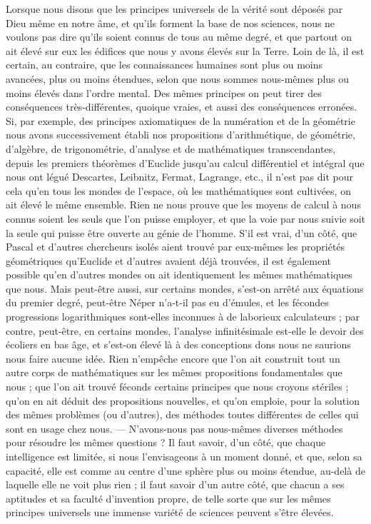 \documentclass[a4paper, 11pt, oneside, landscape]{article}
\begin{document}
Lorsque nous disons que les principes universels de la vérité sont déposés par Dieu même en notre âme, et qu'ils forment la base de nos sciences, nous ne voulons pas dire qu'ils soient connus de tous au même degré, et que partout on ait élevé sur eux les édifices que nous y avons élevés sur la Terre. Loin de là, il est certain, au contraire, que les connaissances humaines sont plus ou moins avancées, plus ou moins étendues, selon que nous sommes nous-mêmes plus ou moins élevés dans l'ordre mental. Des mêmes principes on peut tirer des conséquences très-différentes, quoique vraies, et aussi des conséquences erronées. Si, par exemple, des principes axiomatiques de la numération et de la géométrie nous avons successivement établi nos propositions d'arithmétique, de géométrie, d'algèbre, de trigonométrie, d'analyse et de mathématiques transcendantes, depuis les premiers théorèmes d'Euclide jusqu'au calcul différentiel et intégral que nous ont légué Descartes, Leibnitz, Fermat, Lagrange, etc., il n'est pas dit pour cela qu'en tous les mondes de l'espace, où les mathématiques sont cultivées, on ait élevé le même ensemble. Rien ne nous prouve que les moyens de calcul à nous connus soient les seuls que l'on puisse employer, et que la voie par nous suivie soit la seule qui puisse être ouverte au génie de l'homme. S'il est vrai, d'un côté, que Pascal et d'autres chercheurs isolés aient trouvé par eux-mêmes les propriétés géométriques qu'Euclide et d'autres avaient déjà trouvées, il est également possible qu'en d'autres mondes on ait identiquement les mêmes mathématiques que nous. Mais peut-être aussi, sur certains mondes, s'est-on arrêté aux équations du premier degré, peut-être Néper n'a-t-il pas eu d'émules, et les fécondes progressions logarithmiques sont-elles inconnues à de laborieux calculateurs ; par contre, peut-être, en certains mondes, l'analyse infinitésimale est-elle le devoir des écoliers en bas âge, et s'est-on élevé là à des conceptions dons nous ne saurions nous faire aucune idée. Rien n'empêche encore que l'on ait construit tout un autre corps de mathématiques sur les mêmes propositions fondamentales que nous ; que l'on ait trouvé féconds certains principes que nous croyons stériles ; qu'on en ait déduit des propositions nouvelles, et qu'on emploie, pour la solution des mêmes problèmes (ou d'autres), des méthodes toutes différentes de celles qui sont en usage chez nous. --- N'avons-nous pas nous-mêmes diverses méthodes pour résoudre les mêmes questions ? Il faut savoir, d'un côté, que chaque intelligence est limitée, si nous l'envisageons à un moment donné, et que, selon sa capacité, elle est comme au centre d'une sphère plus ou moins étendue, au-delà de laquelle elle ne voit plus rien ; il faut savoir d'un autre côté, que chacun a ses aptitudes et sa faculté d'invention propre, de telle sorte que sur les mêmes principes universels une immense variété de sciences peuvent s'être élevées.
\end{document}
